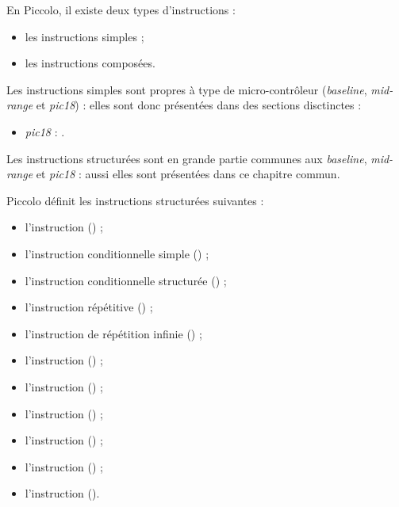 
\cleardoublepage


\thispagestyle{empty}

En Piccolo, il existe deux types d'instructions :
\begin{itemize}
  \item les instructions simples ;
  \item les instructions composées.
\end{itemize}

Les instructions simples sont propres à type de micro-contrôleur (\emph{baseline}, \emph{mid-range} et \emph{pic18}) : elles sont donc présentées dans des sections disctinctes :
\begin{itemize}
  \item \emph{pic18} : .
\end{itemize}


Les instructions structurées sont en grande partie communes aux \emph{baseline}, \emph{mid-range} et \emph{pic18} : aussi elles sont présentées dans ce chapitre commun.

Piccolo définit les instructions structurées suivantes :
\begin{itemize}
  \item l'instruction  () ;
  \item l'instruction conditionnelle simple () ;
  \item l'instruction conditionnelle structurée () ;
  \item l'instruction répétitive () ;
  \item l'instruction de répétition infinie () ;
  \item l'instruction  () ;
  \item l'instruction  () ;
  \item l'instruction  () ;
  \item l'instruction  () ;
  \item l'instruction  () ;
  \item l'instruction  ().
\end{itemize}

